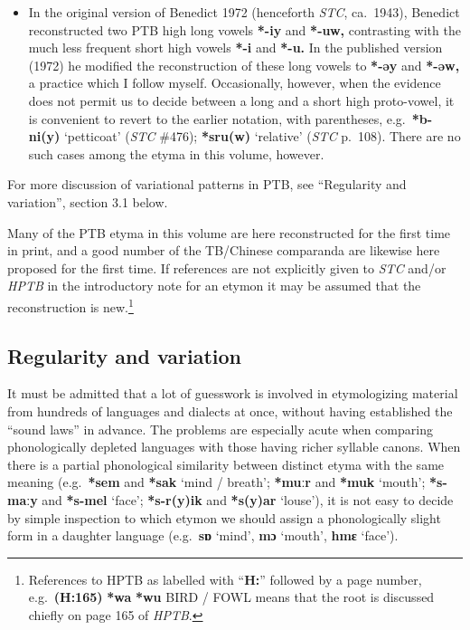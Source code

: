 \begin{itemize}
\item In the original version of Benedict 1972 (henceforth \textit{STC}, ca.~1943), Benedict reconstructed two PTB high
long vowels \textbf{*-iy} and \textbf{*-uw,} contrasting with the much less frequent short high
vowels \textbf{*-i} and \textbf{*-u.}  In the published version (1972) he modified the
reconstruction of these long vowels to \textbf{*-əy} and \textbf{*-əw,} a practice which I follow
myself.  Occasionally, however, when the evidence does not permit us to decide
between a long and a short high proto-vowel, it is convenient to revert to the
earlier notation, with parentheses, e.g.\ \textbf{*b-ni(y)} ‘petticoat’ (\textit{STC} \#476);
\textbf{*sru(w)} ‘relative’ (\textit{STC} p.~108).  There are no such cases among the etyma in
this volume, however.
\end{itemize}


For more discussion of variational patterns in PTB, see “Regularity and
variation”, section 3.1 below.


Many of the PTB etyma in this volume are here reconstructed for the first
time in print, and a good number of the TB/Chinese comparanda are likewise here
proposed for the first time.  If references are not explicitly given to \textit{STC}
and/or \textit{HPTB} in the introductory note for an etymon it may be assumed that the
reconstruction is new.\footnote{References to HPTB as labelled with “\textbf{H:}” followed by a page number, e.g.\ \textbf{(H:165)} \textbf{*wa}  \textbf{*wu} BIRD / FOWL means that the root is discussed chiefly on page 165 of \textit{HPTB}.}

\subsection{Regularity and variation}

It must be admitted that a lot of guesswork is involved in etymologizing
material from hundreds of languages and dialects at once, without having
established the “sound laws” in advance. The problems are especially acute when
comparing phonologically depleted languages with those having richer syllable
canons. When there is a partial phonological similarity between distinct etyma
with the same meaning (e.g.\ \textbf{*sem} and \textbf{*sak}  ‘mind / breath’;
\textbf{*muːr} and \textbf{*muk}
‘mouth’; \textbf{*s-maːy} and \textbf{*s-mel} ‘face’;
\textbf{*s-r(y)ik} and \textbf{*s(y)ar} ‘louse’), it is not
easy to decide by simple inspection to which etymon we should assign a
phonologically slight form in a daughter language (e.g.\ \textbf{sɒ} ‘mind’,
\textbf{mɔ} ‘mouth’,
\textbf{hmɛ} ‘face’).


